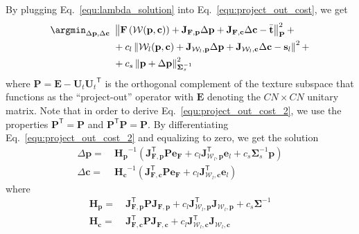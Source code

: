 %
By plugging Eq.~\ref{equ:lambda_solution} into Eq.~\ref{equ:project_out_cost},
we get
%
\begin{equation}
\begin{aligned}
\argmin_{\Delta\mathbf{p},\Delta\mathbf{c}}~& \left\lVert\mathbf{F}\left(\mathcal{W}(\mathbf{p},\mathbf{c})\right) + \mathbf{J}_{\mathbf{F},\mathbf{p}}\Delta\mathbf{p} + \mathbf{J}_{\mathbf{F},\mathbf{c}}\Delta\mathbf{c} - \bar{\mathbf{t}}\right\rVert^2_\mathbf{P} + \\
& + c_l\left\lVert\mathcal{W}_l(\mathbf{p},\mathbf{c}) + \mathbf{J}_{\mathcal{W}_l,\mathbf{p}}\Delta\mathbf{p} + \mathbf{J}_{\mathcal{W}_l,\mathbf{c}}\Delta\mathbf{c} - \mathbf{s}_l\right\rVert^2 +\\
& + c_s\left\lVert\mathbf{p}+\Delta\mathbf{p}\right\rVert^2_{\mathbf{\Sigma}_s^{-1}}
\end{aligned}
\label{equ:project_out_cost_2}
\end{equation}
%
where $\mathbf{P}=\mathbf{E}-\mathbf{U}_t{\mathbf{U}_t}^\mathsf{T}$ is the
orthogonal complement of the texture subspace that functions as the
``project-out'' operator with $\mathbf{E}$ denoting the $CN \times CN$ unitary matrix.
Note that in order to derive Eq.~\ref{equ:project_out_cost_2}, we use the properties
$\mathbf{P}^\mathsf{T}=\mathbf{P}$
and
$\mathbf{P}^\mathsf{T}\mathbf{P}=\mathbf{P}$. By differentiating
Eq.~\ref{equ:project_out_cost_2} and equalizing to zero, we get the solution
%
\begin{equation}
\begin{aligned}
\Delta\mathbf{p} = &~{\mathbf{H}_{\mathbf{p}}}^{-1} \left( \mathbf{J}_{\mathbf{F},\mathbf{p}}^\mathsf{T} \mathbf{P} \mathbf{e}_{\mathbf{F}} + c_l\mathbf{J}_{\mathcal{W}_l,\mathbf{p}}^\mathsf{T}\mathbf{e}_l + c_s\mathbf{\Sigma}^{-1}_s\mathbf{p}\right)\\
\Delta\mathbf{c} = &~{\mathbf{H}_{\mathbf{c}}}^{-1} \left( \mathbf{J}_{\mathbf{F},\mathbf{c}}^\mathsf{T} \mathbf{P} \mathbf{e}_{\mathbf{F}} + c_l\mathbf{J}_{\mathcal{W}_l,\mathbf{c}}^\mathsf{T}\mathbf{e}_l\right)
\end{aligned}
\label{equ:project_out_solution}
\end{equation}
%
where
%
\begin{equation}
\begin{aligned}
\mathbf{H}_{\mathbf{p}} = &~\mathbf{J}_{\mathbf{F},\mathbf{p}}^\mathsf{T}\mathbf{P}\mathbf{J}_{\mathbf{F},\mathbf{p}} + c_l\mathbf{J}_{\mathcal{W}_l,\mathbf{p}}^\mathsf{T}\mathbf{J}_{\mathcal{W}_l,\mathbf{p}} + c_s\mathbf{\Sigma}^{-1}\\
\mathbf{H}_{\mathbf{c}} = &~\mathbf{J}_{\mathbf{F},\mathbf{c}}^\mathsf{T}\mathbf{P}\mathbf{J}_{\mathbf{F},\mathbf{c}} + c_l\mathbf{J}_{\mathcal{W}_l,\mathbf{c}}^\mathsf{T}\mathbf{J}_{\mathcal{W}_l,\mathbf{c}}
\end{aligned}
\end{equation}
